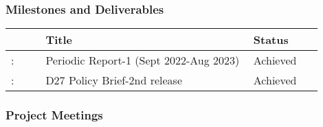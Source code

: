 \subsubsection*{Milestones and Deliverables}

{\fontsize{9}{11}\selectfont
\begin{center}
  \begin{tabular}[t]{!{\color{mygray}\vrule}p{0.10\linewidth}!
  {\color{mygray}\vrule}p{0.60\linewidth}!
  {\color{mygray}\vrule}p{0.20\linewidth}!{\color{mygray}\vrule} } \hline
     & {\bf Title} & {\bf Status} \\ \hline
    : & Periodic Report-1 (Sept 2022-Aug 2023) &  Achieved\\ \hline
   : & D27 Policy Brief-2nd release &  Achieved\\ \hline 
  \end{tabular}
\end{center}
}

\subsubsection*{Project Meetings}

